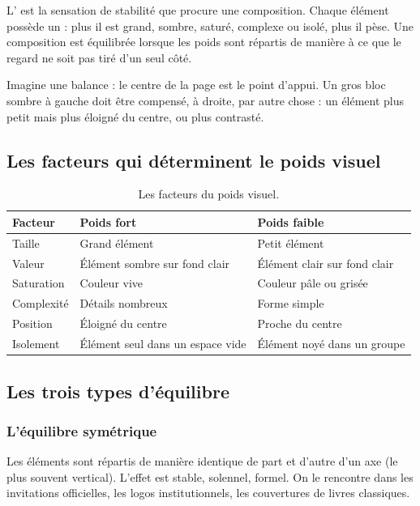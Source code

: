 L' est la sensation de stabilité que procure une composition. Chaque élément possède un  : plus il est grand, sombre, saturé, complexe ou isolé, plus il pèse. Une composition est équilibrée lorsque les poids sont répartis de manière à ce que le regard ne soit pas tiré d'un seul côté.

Imagine une balance : le centre de la page est le point d'appui. Un gros bloc sombre à gauche doit être compensé, à droite, par autre chose : un élément plus petit mais plus éloigné du centre, ou plus contrasté.

\subsection{Les facteurs qui déterminent le poids visuel}

\begin{table}[h!]
\centering
\begin{tabular}{@{}p{3.5cm}p{5cm}p{5cm}@{}}
\toprule
\textbf{Facteur} & \textbf{Poids fort} & \textbf{Poids faible} \\
\midrule
Taille & Grand élément & Petit élément \\
Valeur & Élément sombre sur fond clair & Élément clair sur fond clair \\
Saturation & Couleur vive & Couleur pâle ou grisée \\
Complexité & Détails nombreux & Forme simple \\
Position & Éloigné du centre & Proche du centre \\
Isolement & Élément seul dans un espace vide & Élément noyé dans un groupe \\
\bottomrule
\end{tabular}
\caption{Les facteurs du poids visuel.}
\end{table}

\subsection{Les trois types d'équilibre}

\subsubsection{L'équilibre symétrique}

Les éléments sont répartis de manière identique de part et d'autre d'un axe (le plus souvent vertical). L'effet est stable, solennel, formel. On le rencontre dans les invitations officielles, les logos institutionnels, les couvertures de livres classiques.

